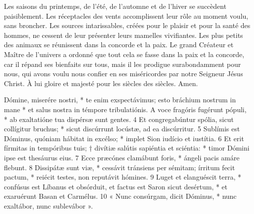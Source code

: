 \documentclass[RG2023_CarnetSpecial.tex]{subfiles}
\begin{document}

Les saisons du printemps, de l'été, de l'automne et de l'hiver se succèdent paisiblement.
Les réceptacles des vents accomplissent leur rôle au moment voulu, sans broncher.
Les sources intarissables, créées pour le plaisir et pour la santé des hommes,
	ne cessent de leur présenter leurs mamelles vivifiantes.
Les plus petits des animaux se réunissent dans la concorde et la paix.
Le grand Créateur et Maître de l'univers
	a ordonné que tout cela se fasse dans la paix et la concorde,
	car il répand ses bienfaits sur tous, mais il les prodigue surabondamment pour nous,
	qui avons voulu nous confier en ses miséricordes par notre Seigneur Jésus Christ.
À lui gloire et majesté pour les siècles des siècles. Amen.





Dómine, miserére nostri, *
te enim exspectávimus;
esto bráchium nostrum in mane *
et salus nostra in témpore tribulatiónis.
A voce fragóris fugérunt pópuli, *
ab exaltatióne tua dispérsæ sunt gentes.
4 Et congregabúntur spólia, sicut collígitur bruchus; *
sicut discúrrunt locústæ, ad ea discúrritur.
5 Sublímis est Dóminus, quóniam hábitat in excélso; *
implet Sion iudício et iustítia.
6 Et erit fírmitas in tempóribus tuis; †
divítiæ salútis sapiéntia et sciéntia: *
timor Dómini ipse est thesáurus eius.
7 Ecce præcónes clamábunt foris, *
ángeli pacis amáre flebunt.
8 Dissipátæ sunt viæ, *
cessávit tránsiens per sémitam;
írritum fecit pactum, *
reiécit testes,
non reputávit hómines.
9 Luget et elanguéscit terra, *
confúsus est Líbanus et obsórduit,
et factus est Saron sicut desértum, *
et exaruérunt Basan et Carmélus.
10 « Nunc consúrgam, dicit Dóminus, *
nunc exaltábor, nunc sublevábor ».
\end{document}
